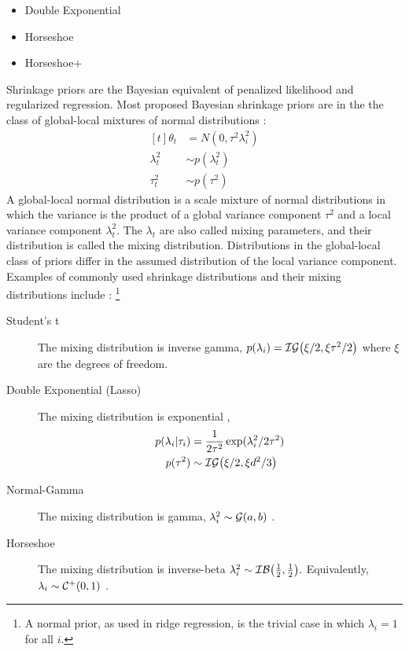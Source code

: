 \begin{itemize}
\item Double Exponential
\item Horseshoe
\item Horseshoe+ 
\end{itemize}

Shrinkage priors are the Bayesian equivalent of penalized likelihood and regularized regression.
Most proposed Bayesian shrinkage priors are in the the class of global-local mixtures of normal distributions \parencite{PolsonScott2010}:
\begin{equation}
  \label{dlm:eq:3}
  \begin{aligned}[t]
    \theta_{t} &= N(0, \tau^{2} \lambda_{i}^{2}) \\ 
    \lambda_{t}^{2} &\sim p(\lambda_{t}^{2}) \\
    \tau_{t}^{2} &\sim p(\tau^{2})
  \end{aligned}
\end{equation}
A global-local normal distribution is a scale mixture of normal distributions in which the variance is the product of a global variance component $\tau^{2}$ and a local variance component $\lambda_{t}^{2}$.
The $\lambda_t$ are also called mixing parameters, and their distribution is called the mixing distribution.
Distributions in the global-local class of priors differ in the assumed distribution of the local variance component. 
Examples of commonly used shrinkage distributions and their mixing distributions include \parencite{PolsonScott2010}:%
\footnote{A normal prior, as used in ridge regression, is the trivial case in which $\lambda_{i} = 1$ for all $i$.}

\begin{description}
\item[Student's t] The mixing distribution is inverse gamma, $p(\lambda_{i}) = \mathcal{IG}\mathopen{}\left(\xi / 2, \xi \tau^{2} / 2\right)\mathclose{}$ where $\xi$ are the degrees of freedom. \parencite{Tipping2001}
\item[Double Exponential (Lasso)] The mixing distribution is exponential \parencites{ParkCasella2008}{Hans2009},
\begin{equation}
  \begin{aligned}[t]
    p(\lambda_{i} | \tau_{i}) &= \frac{1}{2 \tau^{2}} \exp (\lambda_{i}^{2} / 2 \tau^{2}) \\
    p(\tau^{2}) &\sim \mathcal{IG}\mathopen{}\left(\xi / 2, \xi d^{2} / 3\right)\mathclose{}
  \end{aligned}
\end{equation}
\item[Normal-Gamma] The mixing distribution is gamma, $\lambda^{2}_{i} \sim \mathcal{G}\mathopen{}\left(a, b\right)\mathclose{}$ \parencites{CaronDoucet2008}{BrownGriffin2010}.
\item[Horseshoe] The mixing distribution is inverse-beta $\lambda^{2}_{i} \sim \mathcal{IB}\mathopen{}\left(\frac{1}{2}, \frac{1}{2}\right)\mathclose{}.$ 
Equivalently, $\lambda_{i} \sim \mathcal{C^+}\mathopen{}\left(0, 1\right)\mathclose{}$ \parencite{CarvalhoPolsonScott2010}.
\end{description}


